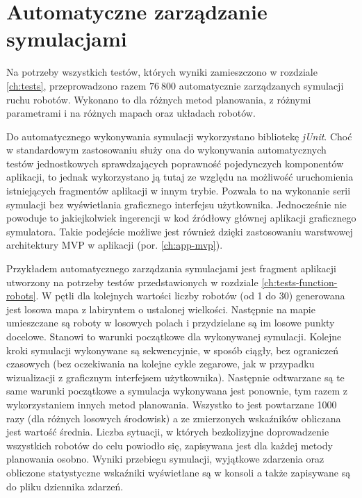 \section{Automatyczne zarządzanie symulacjami}
Na potrzeby wszystkich testów, których wyniki zamieszczono w rozdziale \ref{ch:tests}, przeprowadzono razem $76\ 800$ automatycznie zarządzanych symulacji ruchu robotów. Wykonano to dla różnych metod planowania, z różnymi parametrami i na różnych mapach oraz układach robotów.

Do automatycznego wykonywania symulacji wykorzystano bibliotekę {\it jUnit}. Choć w standardowym zastosowaniu służy ona do wykonywania automatycznych testów jednostkowych sprawdzających poprawność pojedynczych komponentów aplikacji, to jednak wykorzystano ją tutaj ze względu na możliwość uruchomienia istniejących fragmentów aplikacji w innym trybie.
Pozwala to na wykonanie serii symulacji bez wyświetlania graficznego interfejsu użytkownika.
Jednocześnie nie powoduje to jakiejkolwiek ingerencji w kod źródłowy głównej aplikacji graficznego symulatora.
Takie podejście możliwe jest również dzięki zastosowaniu warstwowej architektury MVP w aplikacji (por. \ref{ch:app-mvp}).

Przykładem automatycznego zarządzania symulacjami jest fragment aplikacji utworzony na potrzeby testów przedstawionych w rozdziale \ref{ch:tests-function-robots}.
W pętli dla kolejnych wartości liczby robotów (od 1 do 30) generowana jest losowa mapa z labiryntem o ustalonej wielkości.
Następnie na mapie umieszczane są roboty w losowych polach i przydzielane są im losowe punkty docelowe.
Stanowi to warunki początkowe dla wykonywanej symulacji. Kolejne kroki symulacji wykonywane są sekwencyjnie, w sposób ciągły, bez ograniczeń czasowych (bez oczekiwania na kolejne cykle zegarowe, jak w przypadku wizualizacji z graficznym interfejsem użytkownika).
Następnie odtwarzane są te same warunki początkowe a symulacja wykonywana jest ponownie, tym razem z wykorzystaniem innych metod planowania.
Wszystko to jest powtarzane 1000 razy (dla różnych losowych środowisk) a ze zmierzonych wskaźników obliczana jest wartość średnia.
Liczba sytuacji, w których bezkolizyjne doprowadzenie wszystkich robotów do celu powiodło się, zapisywana jest dla każdej metody planowania osobno.
Wyniki przebiegu symulacji, wyjątkowe zdarzenia oraz obliczone statystyczne wskaźniki wyświetlane są w konsoli a także zapisywane są do pliku dziennika zdarzeń.

